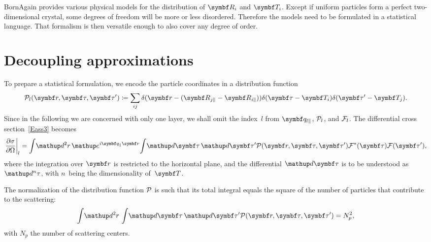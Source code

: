 \addtocounter{footnote}{1}

BornAgain provides various physical models
for the distribution of $\R_i$ and $\v{T}_i$.
Except if uniform particles form a perfect two-dimensional crystal,
some degrees of freedom will be more or less disordered.
Therefore the models need to be formulated in a statistical language.
That formalism is then versatile enough to also cover any degree of order.

\section{Decoupling approximations}\label{Spartidis}

To prepare a statistical formulation,
we encode the particle coordinates in a distribution function
%
%
%
\begin{equation}\label{EPDdeltas}
  \PD_{l}(\r,\v\tau,\v\tau')
  \coloneqq \sum_{ij} \delta(\r-(\R_{j\plll}-\R_{i\plll}))
  \delta(\v\tau-\v{T}_i)\delta(\v\tau'-\v{T}_j).
\end{equation}
Since in the following we are concerned with only one layer,
we shall omit the index~$l$ from $\q_{l\plll}$, $\mathcal{P}_l$, and $\mathcal{F}_l$.
The differential cross section~\cref{Eass3} becomes
\begin{equation}\label{Epdm1}
  \left.\frac{\partial\sigma}{\partial\Omega}\right|_l
  =
  \int\!\d^2r\,   \e^{i\q_{\plll}\r}\!
  \int\! \d\v{\tau}\, \d\v{\tau}'
    \PD(\r,\v\tau,\v\tau')
    \FD^*(\v\tau) \FD(\v\tau'),
\end{equation}
where the integration over $\r$ is restricted to the horizontal plane,
and the differential $\d\v{\tau}$ is to be understood as $\d^n\tau$,
with $n$~being the dimensionality of~$\v{T}$.

The normalization of the distribution function $\mathcal{P}$ is such that its total
integral equals the square of the number of particles that contribute to the scattering:
\begin{equation}
  \int\!\d^2r\, \int\! \d\v{\tau}\, \d\v{\tau}' \PD(\r,\v\tau,\v\tau')
  = N_p^2,
\end{equation}
with $N_p$ the number of scattering centers.


